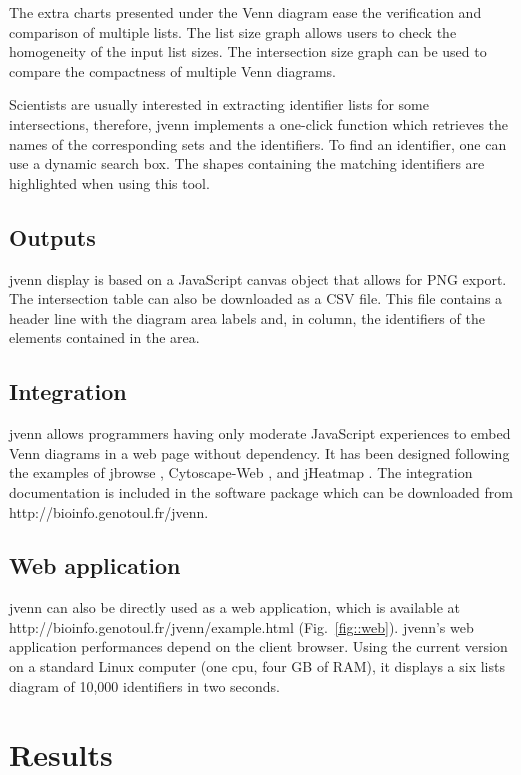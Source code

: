 \documentclass{bmcart}
\begin{document}
The extra charts presented under the Venn diagram ease the verification and
comparison of multiple lists. The list size graph allows users to check the
homogeneity of the input list sizes. The intersection size graph can be used to
compare the compactness of multiple Venn diagrams.

Scientists are usually interested in extracting identifier lists for some
intersections, therefore, jvenn implements a one-click function which retrieves
the names of the corresponding sets and the identifiers. To find an identifier,
one can use a dynamic search box. The shapes containing the matching 
identifiers are highlighted when using this tool.

\subsection*{Outputs}

jvenn display is based on a JavaScript canvas object that allows for PNG 
export. The intersection table can also be downloaded as a CSV file. This file
contains a header line with the diagram area labels and, in column, the
identifiers of the elements contained in the area.

\subsection*{Integration}

jvenn allows programmers having only moderate JavaScript experiences to embed 
Venn diagrams in a web page without dependency. It has been designed following
the examples of jbrowse \cite{Westesson01032013}, Cytoscape-Web
\cite{Lopes2010}, and jHeatmap \cite{DeuPons2014}.
The integration documentation is included in the software package which can be
downloaded from http://bioinfo.genotoul.fr/jvenn.

\subsection*{Web application}

jvenn can also be directly used as a web application, which is available at 
http://bioinfo.genotoul.fr/jvenn/example.html (Fig.~\ref{fig::web}).
jvenn's web application performances depend on the client browser. Using the 
current version on a standard Linux computer (one cpu, four GB of RAM), it
displays a six lists diagram of 10,000 identifiers in two seconds.


\section*{Results}
\end{document}
